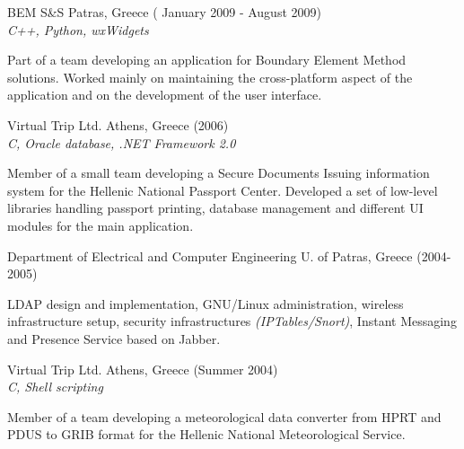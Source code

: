 \documentclass[alan.tex]{subfiles}
\begin{document}
  \item[BEM S\&S] Patras, Greece ( January 2009 - August 2009)\\
  \emph{C++, Python, wxWidgets}
  \begin{my_contractor}
  Part of a team developing an application for Boundary Element Method solutions. Worked mainly on maintaining the cross-platform aspect of the application and on the development of the user interface.
  \end{my_contractor}
  \item[Virtual Trip Ltd.] Athens, Greece (2006) \\
  \emph{ C, Oracle database, .NET Framework 2.0 }
  \begin{my_contractor}
    Member of a small team developing a Secure Documents Issuing information system for the Hellenic National Passport Center.
    Developed a set of low-level libraries handling passport printing, database management and different UI modules for the main application.
  \end{my_contractor}
  \item[Department of Electrical and Computer Engineering] U. of Patras, Greece (2004-2005)
  \begin{my_contractor}
    LDAP design and implementation, GNU/Linux administration, wireless infrastructure setup, security infrastructures \emph{(IPTables/Snort)}, Instant Messaging and Presence Service based on Jabber.
  \end{my_contractor}
  \item[Virtual Trip Ltd.] Athens, Greece (Summer 2004) \\
  \emph{ C, Shell scripting }
  \begin{my_contractor}
    Member of a team developing a meteorological data converter from HPRT and PDUS to GRIB format for the Hellenic National Meteorological Service.
  \end{my_contractor}
\end{document}
